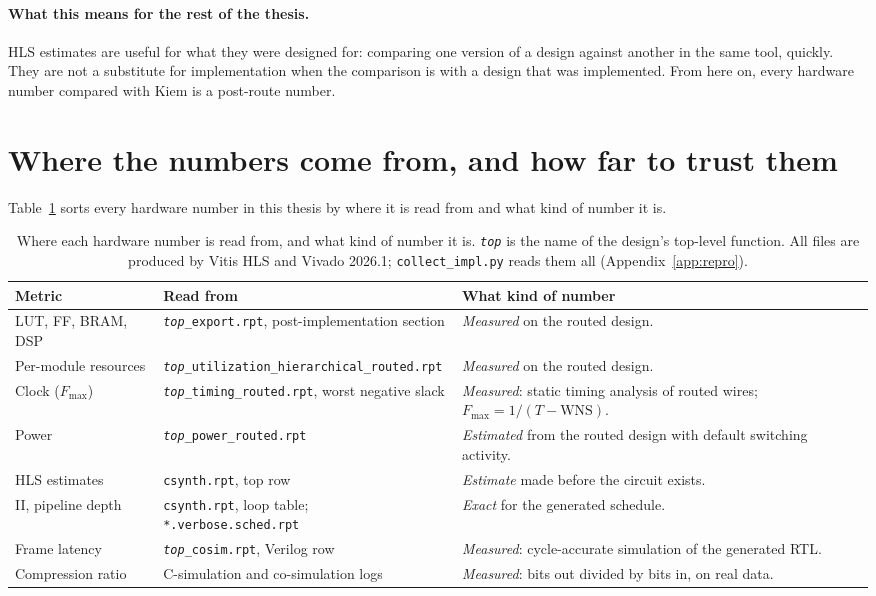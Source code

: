 \paragraph{What this means for the rest of the thesis.} HLS estimates are
useful for what they were designed for: comparing one version of a design
against another in the same tool, quickly. They are not a substitute for
implementation when the comparison is with a design that was implemented. From
here on, every hardware number compared with Kiem is a post-route number.

\section{Where the numbers come from, and how far to trust them}
\label{sec:numsource}

Table~\ref{tab:numsource} sorts every hardware number in this thesis by where it
is read from and what kind of number it is.

\begin{table}[htbp]
\centering
\caption[Where each hardware number comes from]{Where each hardware number is
read from, and what kind of number it is. \texttt{\emph{top}} is the name of the
design's top-level function. All files are produced by Vitis HLS and Vivado
2026.1; \texttt{collect\_impl.py} reads them all (Appendix~\ref{app:repro}).}
\label{tab:numsource}
\small
\begin{tabular}{@{}>{\raggedright}p{}>{\raggedright}p{}>{\raggedright\arraybackslash}p{}@{}}
\toprule
Metric & Read from & What kind of number\\
\midrule
LUT, FF, BRAM, DSP & \texttt{\emph{top}\_export.rpt}, post-implementation section &
\emph{Measured} on the routed design.\\
Per-module resources & \texttt{\emph{top}\_utilization\_hierarchical\_routed.rpt} &
\emph{Measured} on the routed design.\\
Clock ($F_{\max}$) & \texttt{\emph{top}\_timing\_routed.rpt}, worst negative slack &
\emph{Measured}: static timing analysis of routed wires; $F_{\max} = 1/(T - \mathrm{WNS})$.\\
Power & \texttt{\emph{top}\_power\_routed.rpt} &
\emph{Estimated} from the routed design with default switching activity.\\
HLS estimates & \texttt{csynth.rpt}, top row &
\emph{Estimate} made before the circuit exists.\\
II, pipeline depth & \texttt{csynth.rpt}, loop table; \texttt{*.verbose.sched.rpt} &
\emph{Exact} for the generated schedule.\\
Frame latency & \texttt{\emph{top}\_cosim.rpt}, Verilog row &
\emph{Measured}: cycle-accurate simulation of the generated RTL.\\
Compression ratio & C-simulation and co-simulation logs &
\emph{Measured}: bits out divided by bits in, on real data.\\
\bottomrule
\end{tabular}
\end{table}

